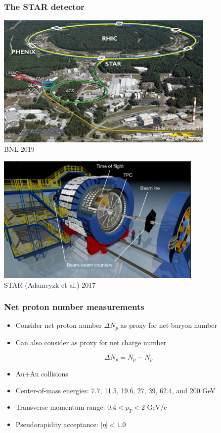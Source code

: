 \documentclass[accentcolor=tud2c,usenames,dvipsnames,colorbacktitle,inverttitle,landscape,german,presentation,t]{tudbeamer}
\begin{document}
  \begin{frame}
    \frametitle{The STAR detector}
    \begin{overprint}
      \begin{center}\includegraphics[width=0.8\textwidth]{figures/06/RHIC}\\\footnotesize{BNL 2019}\end{center}
      \begin{center}\includegraphics[width=0.75\textwidth]{figures/06/star_detector}\\\footnotesize{STAR (Adamcyzk et al.) 2017}\end{center}
    \end{overprint}
  \end{frame}

  \begin{frame}
    \frametitle{Net proton number measurements}
    \begin{itemize}
      \item Consider net proton number $\Delta N_p$ as proxy for net baryon
        number
      \item Can also consider as proxy for net charge number
    \end{itemize}
    \begin{equation*}
      \Delta N_p = N_p - N_{\bar{p}}
    \end{equation*}
    \begin{itemize}
      \item Au+Au collisions
      \item Center-of-mass energies: 7.7, 11.5, 19.6, 27, 39, 62.4, and 200 GeV
      \item Transverse momentum range: $0.4 < p_T < 2$ GeV/c
      \item Pseudorapidity acceptance: $|\eta| < 1.0$
    \end{itemize}
  \end{frame}
\end{document}
